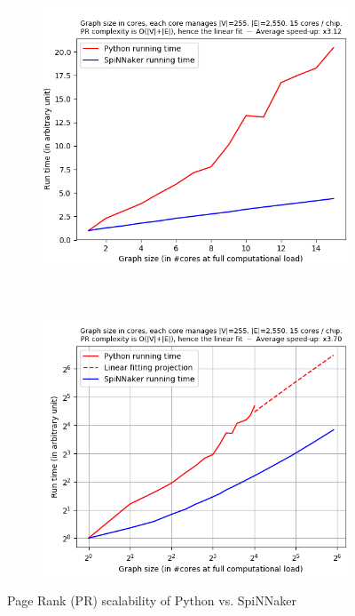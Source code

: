 \begin{figure}[!ht]
    \centering
    \begin{subfigure}[b]{0.5\textwidth}
        \includegraphics[width=\textwidth]{figures/graph_size_vs_running_time-1.png}
        \caption{} \label{fig:graph31}
    \end{subfigure}%
    ~
    \begin{subfigure}[b]{0.5\textwidth}
        \includegraphics[width=\textwidth]{figures/graph_size_vs_running_time-2.png}
        \caption{} \label{fig:graph32}
    \end{subfigure}
    \caption{Page Rank (PR) scalability of Python vs. SpiNNaker}
    \label{fig:graph3}
\end{figure} 

